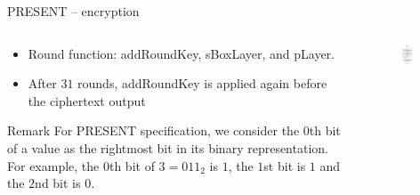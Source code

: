 \begin{frame}{PRESENT -- encryption}
\begin{columns}[T] %
\begin{column}{.55\textwidth}
\begin{itemize}
    \item Round function: addRoundKey, sBoxLayer, and pLayer.
    \item After $31$ rounds, addRoundKey is applied again before the ciphertext output 
\end{itemize}
\begin{alertblock}{Remark}
    For PRESENT specification, we consider the $0$th bit of a value as the rightmost bit in its binary representation.
For example, the $0$th bit of $3=011_2$ is $1$, the $1$st bit is $1$ and the $2$nd bit is $0$.
\end{alertblock}
\end{column}%
\hfill%
\begin{column}{.5\textwidth}
\begin{figure}
    \includegraphics[width=0.6\textwidth]{fig/PRESENT.pdf}
\end{figure}
\end{column}%
\end{columns}
\end{frame}

